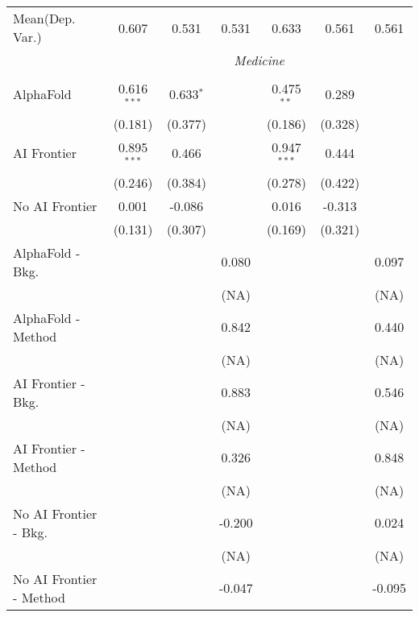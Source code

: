 \begin{tabular}{lcccccc}
Mean(Dep. Var.) & 0.607 & 0.531 & 0.531 & 0.633 & 0.561 & 0.561 \\
 & \multicolumn{6}{c}{\textit{Medicine}} \\ \\
   AlphaFold               & 0.616$^{***}$ & 0.633$^{*}$ &        & 0.475$^{**}$  & 0.289   &   \\   
                           & (0.181)       & (0.377)     &        & (0.186)       & (0.328) &   \\   
   AI Frontier             & 0.895$^{***}$ & 0.466       &        & 0.947$^{***}$ & 0.444   &   \\   
                           & (0.246)       & (0.384)     &        & (0.278)       & (0.422) &   \\   
   No AI Frontier          & 0.001         & -0.086      &        & 0.016         & -0.313  &   \\   
                           & (0.131)       & (0.307)     &        & (0.169)       & (0.321) &   \\   
   AlphaFold - Bkg.        &               &             & 0.080  &               &         & 0.097\\   
                           &               &             & (NA)   &               &         & (NA)\\   
   AlphaFold - Method      &               &             & 0.842  &               &         & 0.440\\   
                           &               &             & (NA)   &               &         & (NA)\\   
   AI Frontier - Bkg.      &               &             & 0.883  &               &         & 0.546\\   
                           &               &             & (NA)   &               &         & (NA)\\   
   AI Frontier - Method    &               &             & 0.326  &               &         & 0.848\\   
                           &               &             & (NA)   &               &         & (NA)\\   
   No AI Frontier - Bkg.   &               &             & -0.200 &               &         & 0.024\\   
                           &               &             & (NA)   &               &         & (NA)\\   
   No AI Frontier - Method &               &             & -0.047 &               &         & -0.095\\   

\end{tabular}
